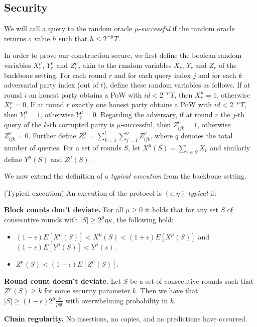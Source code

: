 \subsection{Security}

We will call a query to the random oracle $\mu$-\textit{successful} if the
random oracle returns a value $h$ such that $h \leq 2^{-\mu}T$.

In order to prove our construction secure, we first define the boolean random
variables $X_r^\mu$, $Y_r^\mu$ and $Z_r^\mu$, akin to the random variables
$X_r$, $Y_r$ and $Z_r$ of the backbone setting\cite{backbone}. For each round
$r$ and for each query index $j$ and for each $k$ adversarial party index (out
of $t$), define these random variables as follows.  If at round $i$ an honest
party obtains a PoW with $id < 2^{-\mu}T$, then $X_r^\mu = 1$, otherwise
$X_r^\mu = 0$. If at round $r$ exactly one honest party obtains a PoW with $id <
2^{-\mu}T$, then $Y_r^\mu = 1$, otherwise $Y_r^\mu = 0$. Regarding the
adversary, if at round $r$ the $j$-th query of the $k$-th corrupted party is
$\mu$-successful, then $Z^\mu_{ijk} = 1$, otherwise $Z^\mu_{ijk} = 0$. Further
define $Z^\mu_r = \sum_{k=1}^t \sum_{j=1}^q Z^\mu_{ijk}$, where $q$ denotes the
total number of queries. For a set of rounds $S$, let $X^\mu(S) = \sum_{r \in S}
X_r$ and similarly define $Y^\mu(S)$ and $Z^\mu(S)$.

We now extend the definition of a \textit{typical execution} from the backbone
setting\cite{backbone}.

\begin{definition}{(Typical execution)}
    An execution of the protocol is $(\epsilon, \eta)$-\textit{typical} if:

    \textnormal{\bf Block counts don't deviate.}
    For all $\mu \geq 0$ it holds that for any set $S$ of consecutive rounds
    with $|S| \geq 2^\mu \eta\kappa$, the following hold:

    \begin{itemize}
        \item $(1 - \epsilon)E[X^\mu(S)] < X^\mu(S) < (1 + \epsilon)E[X^\mu(S)]$ and $(1 - \epsilon)E[Y^\mu(S)] < Y^\mu(s)$.
        \item $Z^\mu(S) < (1 + \epsilon)E[Z^\mu(S)]$.
    \end{itemize}

    \textnormal{\bf Round count doesn't deviate.}
    Let $S$ be a set of consecutive rounds such that $Z^\mu(S)
    \geq k$ for some security parameter $k$. Then we have that $|S| \geq (1 -
    \epsilon)2^\mu\frac{k}{pqt}$ with overwhelming probability in $k$.

    \textnormal{\bf Chain regularity.}
    No insertions, no copies, and no predictions \cite{backbone} have occurred.
\end{definition}

